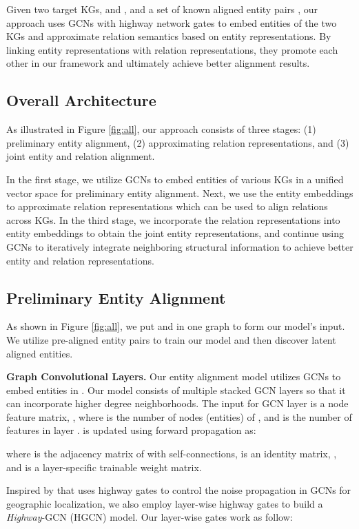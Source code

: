 \documentclass[11pt,a4paper]{article}
\newcommand\cparagraph[1]{\vspace{1mm}\noindent\textbf{#1.}}
\begin{document}
Given two target KGs,  and , and a set of known aligned entity pairs , our approach uses GCNs \cite{Kipf2016Semi}
with highway network \cite{Srivastava2015Highway} gates to embed entities of the two KGs and approximate relation semantics based on
entity representations. By linking entity representations with relation representations, they promote each other in our framework and ultimately achieve better alignment results.

\subsection{Overall Architecture}
\label{section:overall}

As illustrated in Figure \ref{fig:all}, our approach consists of three stages: (1) preliminary entity alignment, (2) approximating relation representations, and (3) joint entity and relation alignment.

In the first stage, we utilize GCNs to embed entities of various KGs in a unified vector space for preliminary entity alignment. Next, we use the entity embeddings to
approximate relation representations which can be used to align relations across KGs. In the third stage, we incorporate the relation representations into entity embeddings to obtain the joint entity representations, and continue using GCNs to iteratively integrate neighboring
structural information to achieve better entity and relation representations.


\subsection{Preliminary Entity Alignment}
\label{preEntAlign}
As shown in Figure \ref{fig:all}, we put  and  in one graph  to form our model's input. We utilize pre-aligned
entity pairs to train our model and then discover latent aligned entities.

\cparagraph{Graph Convolutional Layers} Our entity alignment model utilizes GCNs to embed entities in . Our model consists of multiple
stacked GCN layers so that it can incorporate higher degree neighborhoods. The input for GCN layer  is a node feature matrix, , where  is the number of nodes (entities) of , and
 is the number of features in layer .  is updated using forward propagation as:

where  is the adjacency matrix of  with self-connections,  is an identity matrix,
, and  is a layer-specific trainable weight matrix.


Inspired by \cite{Rahimi2018Semi} that uses highway gates \cite{Srivastava2015Highway} to control the noise propagation in GCNs for geographic localization, we also employ layer-wise highway gates to build a \emph{Highway}-GCN
(HGCN) model. Our layer-wise gates work as follow:
\end{document}
